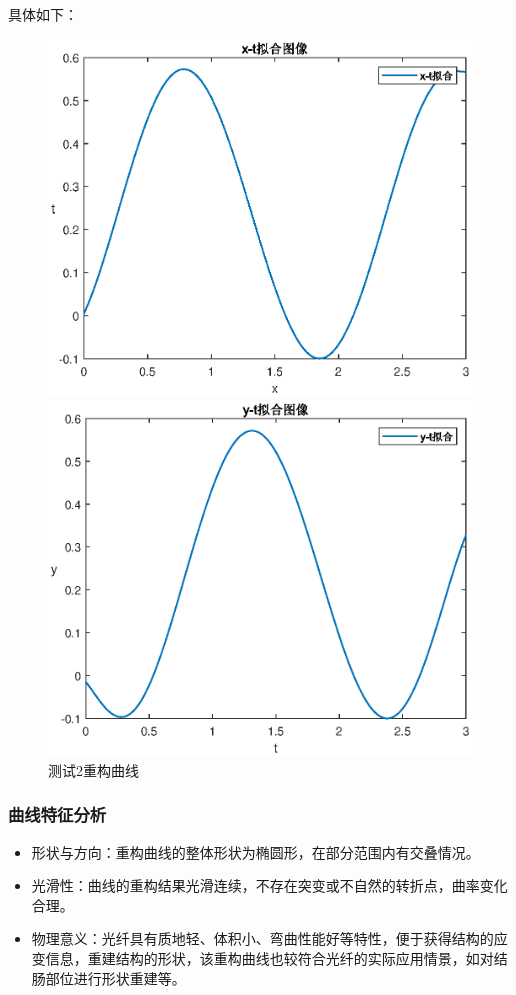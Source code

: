 \documentclass[withoutpreface,bwprint]{cumcmthesis}
\begin{document}
具体如下：
\begin{figure}[!h]  
\centering  
\begin{minipage}{.5\textwidth}  
  \centering  
  \includegraphics[width=.9\linewidth]{2x-t拟合.eps}  
\end{minipage}%
\begin{minipage}{.5\textwidth}  
  \centering  
  \includegraphics[width=.9\linewidth]{2y-t拟合.eps}  
\end{minipage}  
\caption{测试2重构曲线}  
\end{figure} 


\subsubsection{曲线特征分析}
\begin{itemize}
\item 形状与方向：重构曲线的整体形状为椭圆形，在部分范围内有交叠情况。
\item 光滑性：曲线的重构结果光滑连续，不存在突变或不自然的转折点，曲率变化合理。
\item 物理意义：光纤具有质地轻、体积小、弯曲性能好等特性，便于获得结构的应变信息，重建结构的形状，该重构曲线也较符合光纤的实际应用情景，如对结肠部位进行形状重建等。
\end{itemize}
\end{document}
